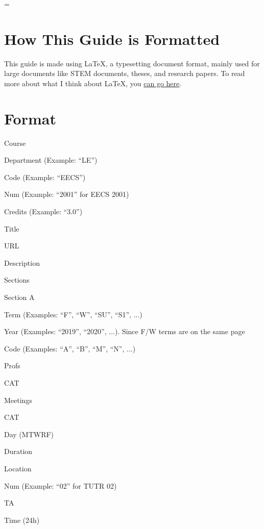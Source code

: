 \emergencystretch=\maxdimen
{}

\maketitle              %

\section{How This Guide is Formatted}
This guide is made using \LaTeX{}, a typesetting document format, mainly used
for large documents like STEM documents, theses, and research papers. To read
more about what I think about \LaTeX{}, you
\href{https://husseinesmail.xyz/articles/is-latex-better.html}{can go here}.

\section{Format}
\noindent Course
\begin{itemize*}
	\item Department (Example: ``LE'')
	\item Code (Example: ``EECS'')
	\item Num (Example: ``2001'' for EECS 2001)
	\item Credits (Example: ``3.0'')
	\item Title
	\item URL
	\item Description
	\item Sections
	\begin{itemize*}
		\item Section A
		\begin{itemize*}
			\item Term (Examples: ``F'', ``W'', ``SU'', ``S1'', ...)
			\item Year (Examples: ``2019'', ``2020'', ...). Since F/W terms are on the same page
			\item Code (Examples: ``A'', ``B'', ``M'', ``N'', ...)
			\item Profs
			\item CAT
			\item Meetings
			\begin{itemize*}
				\item CAT
				\item Day (MTWRF)
				\item Duration
				\item Location
				\item Num (Example: ``02'' for TUTR 02)
				\item TA
				\item Time (24h)
			\end{itemize*}
		\end{itemize*}
	\end{itemize*}
\end{itemize*}


